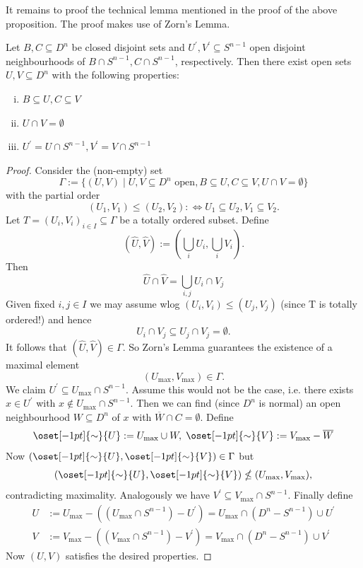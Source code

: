 It remains to proof the technical lemma mentioned in the proof of the above proposition. The proof makes use of Zorn's Lemma.

\begin{lemma}
    \label{lem:technical_lemma1}
    Let $B , C \subseteq D^n$ be closed disjoint sets and $U^\prime, V^\prime \subseteq S^{n-1}$ open disjoint neighbourhoods of $B \cap S^{n-1}, C \cap S^{n-1}$, respectively. Then there exist open sets $U,V \subseteq D^n$ with the following properties:
    \begin{enumerate}[(i)]
        \item $B \subseteq U, C \subseteq V$
        \item $U \cap V =\emptyset$
        \item $U^\prime = U \cap S^{n-1}, V^\prime = V \cap S^{n-1}$
    \end{enumerate}
\end{lemma}

\begin{proof}
    Consider the (non-empty) set 
    \[
    \Gamma := \{(U,V) \mid U,V \subseteq D^n \text{ open}, B \subseteq U, C \subseteq V, U \cap V = \emptyset\}
    \]
    with the partial order
    \[
    (U_1,V_1) \leq (U_2,V_2) :\Leftrightarrow U_1 \subseteq U_2, V_1 \subseteq V_2.
    \]
    Let $T = (U_i,V_i)_{i \in I} \subseteq \Gamma$ be a totally ordered subset. Define
    \[
    (\hat{U},\hat{V}) := \left(\bigcup_i U_i, \bigcup_i V_i\right).
    \]
    Then 
    \[
    \hat{U} \cap \hat{V} = \bigcup_{i,j} U_i \cap V_j
    \]
    Given fixed $i,j \in I$ we may assume wlog $(U_i,V_i) \leq (U_j,V_j)$ (since T is totally ordered!) and hence
    \[
    U_i \cap V_j \subseteq U_j \cap V_j = \emptyset.
    \]
    It follows that $(\hat{U},\hat{V}) \in \Gamma$. So Zorn's Lemma guarantees the existence of a maximal element
    \[
    (U_\mathrm{max},V_\mathrm{max}) \in \Gamma.
    \]
    We claim $U^\prime \subseteq U_{\mathrm{max}} \cap S^{n-1}$. Assume this would not be the case, i.e. there exists $x \in U^\prime$ with $x \notin U_\mathrm{max} \cap S^{n-1}$. Then we can find (since $D^n$ is normal) an open neighbourhood $W \subseteq D^n$ of $x$ with $\overline{W} \cap C = \emptyset$. Define
    \[
    \oset[-1pt]{\sim}{U} := U_{\mathrm{max}} \cup W, \; \oset[-1pt]{\sim}{V} := V_{\mathrm{max}} - \overline{W}
    \]
    Now $(\oset[-1pt]{\sim}{U},\oset[-1pt]{\sim}{V}) \in \Gamma$ but \[
        (\oset[-1pt]{\sim}{U},\oset[-1pt]{\sim}{V}) \nleq  (U_\mathrm{max},V_\mathrm{max}),
    \]
    contradicting maximality. Analogously we have $V^\prime \subseteq V_{\mathrm{max}} \cap S^{n-1}$. Finally define
    \begin{align*}
        U & := U_{\mathrm{max}} - ((U_{\mathrm{max}} \cap S^{n-1}) - U^\prime) = U_{\mathrm{max}} \cap (D^n - S^{n-1}) \cup U^\prime \\
        V & := V_{\mathrm{max}} - ((V_{\mathrm{max}} \cap S^{n-1}) - V^\prime) = V_{\mathrm{max}} \cap (D^n - S^{n-1}) \cup V^\prime 
    \end{align*}
    Now $(U,V)$ satisfies the desired properties.
    
\end{proof}